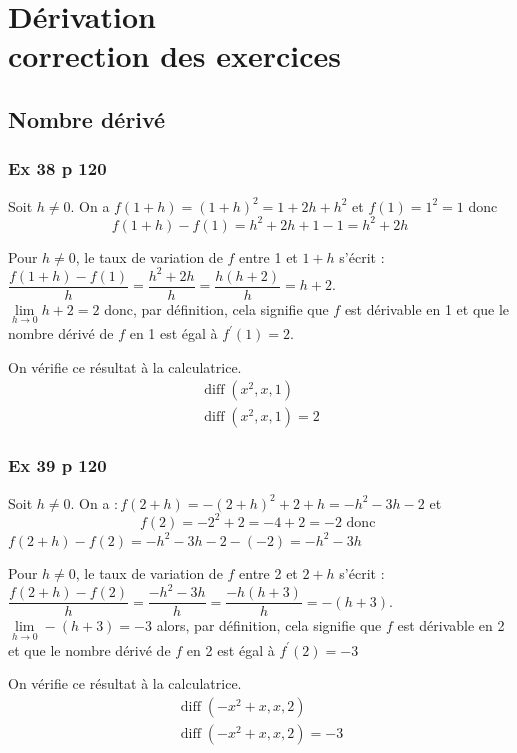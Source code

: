 \documentclass[12pt,a4paper]{book}
\begin{document}
\graphicspath{{../images/}}
\setcounter{chapter}{4}
\chapter[Correction des exercices]{Dérivation \\ correction des exercices}
\thispagestyle{fancy}

\section*{Nombre dérivé}

\subsection*{Ex 38 p 120}

\begin{enumMet}
\item Soit $h \neq 0$. On a $f(1+h)=(1+h)^{2}=1+2 h+h^{2}$ et $f(1)=1^{2}=1$ donc
$$
f(1+h)-f(1)=h^{2}+2 h+1-1=h^{2}+2 h
$$
\item Pour $h \neq 0$, le taux de variation de $f$ entre 1 et $1+h$ s'écrit :\\
$\dfrac{f(1+h)-f(1)}{h}=\dfrac{h^{2}+2 h}{h}=\dfrac{h(h+2)}{h}=h+2$.\\
$\lim\limits_{h \rightarrow 0} h+2=2$ donc, par définition, cela signifie que $f$ est dérivable en 1 et que le nombre dérivé de $f$ en 1 est égal à $f^{\prime}(1)=2$.
\item On vérifie ce résultat à la calculatrice.
$$
\begin{array}{r}
\operatorname{diff}\left(x^{2}, x, 1\right) \\
\operatorname{diff}\left(x^{2}, x, 1\right) = 2
\end{array}
$$
\end{enumMet}


\subsection*{Ex 39 p 120}

\begin{enumMet}
\item Soit $h \neq 0$. On a $: f(2+h)=-(2+h)^{2}+2+h=-h^{2}-3 h-2$ et
$$
f(2)=-2^{2}+2=-4+2=-2 \text { donc }
$$
$f(2+h)-f(2)=-h^{2}-3 h-2-(-2)=-h^{2}-3 h$
\item Pour $h \neq 0$, le taux de variation de $f$ entre 2 et $2+h$ s'écrit :\\
$\dfrac{f(2+h)-f(2)}{h}=\dfrac{-h^{2}-3 h}{h}=\dfrac{-h(h+3)}{h}=-(h+3)$.\\
$\lim\limits_{h \rightarrow 0} -(h+3)=-3$ alors, par définition, cela signifie que $f$ est dérivable en 2 et que le nombre dérivé de $f$ en 2 est égal à $f^{\prime}(2)=-3$
\item On vérifie ce résultat à la calculatrice.
$$
\begin{array}{r}
\operatorname{diff}\left(-x^{2}+x, x, 2\right) \\
\operatorname{diff}\left(-x^{2}+x, x, 2\right) = -3
\end{array}
$$
\end{enumMet}
\end{document}
